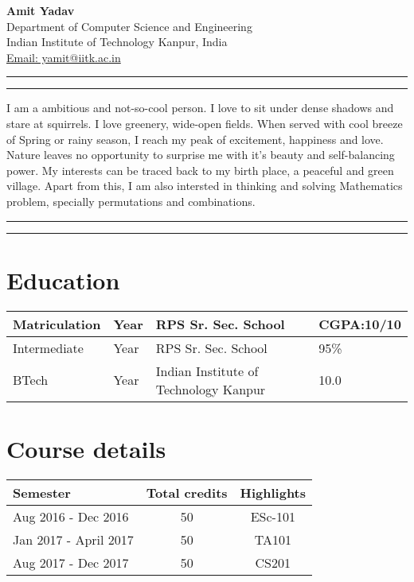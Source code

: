 \documentclass{article}
\begin{document}
\noindent\textbf{Amit Yadav}\\
Department of Computer Science and Engineering \\
Indian Institute of Technology Kanpur, India\\
\href{mailto:yamit@iitk.ac.in}{Email: yamit@iitk.ac.in}\\
\hrule
\vspace{1mm}
\hrule
\vspace{1mm}
\noindent I am a ambitious and not-so-cool person. I love to sit under dense shadows and stare at squirrels. I love greenery, wide-open fields. When served with cool breeze of Spring or rainy season, I reach my peak of excitement, happiness and  love. Nature leaves no opportunity to surprise me with it's beauty and self-balancing power. My interests can be traced back to my birth place, a peaceful and green village.
Apart from this, I am also intersted in thinking and solving Mathematics problem, specially permutations and combinations.
\vspace{1mm}
\hrule
\vspace{1mm}
\hrule

\section*{Education}
\begin{tabular}{|l|l|l|l|}
\hline
    Matriculation & Year & RPS Sr. Sec. School & CGPA:10/10\\
\hline
    Intermediate & Year & RPS Sr. Sec. School & 95\%\\
\hline
    BTech & Year & Indian Institute of Technology Kanpur & 10.0 \\
\hline
\end{tabular}

\section*{Course details}
\begin{tabular}{|l|c|c|}
    \hline
    \textbf{Semester} & \textbf{Total credits} & \textbf{Highlights} \\
    \hline
     Aug 2016 - Dec 2016 & 50 & ESc-101 \\
     \hline
     Jan 2017 - April 2017 & 50 & TA101 \\
     \hline
     Aug 2017 - Dec 2017 & 50 & CS201 \\
     \hline
\end{tabular}
\end{document}
